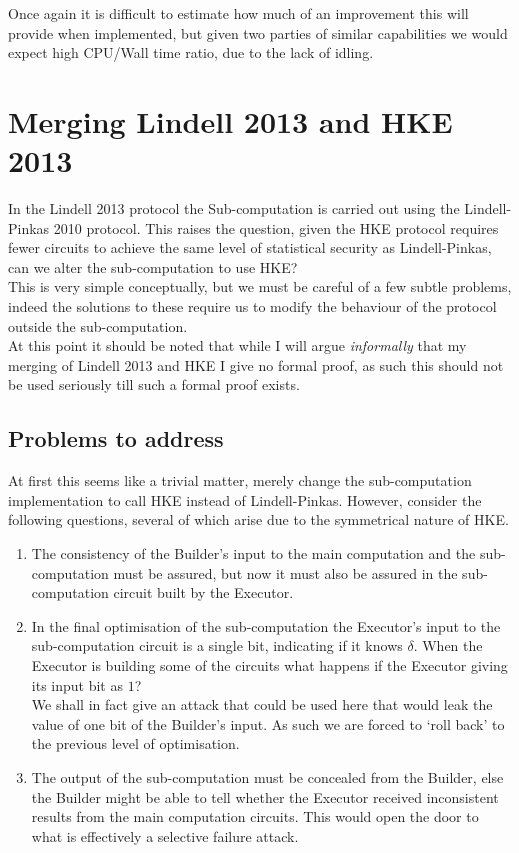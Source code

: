 \documentclass[ %
                    author={Nicholas Tutte},
                supervisor={Prof. Nigel Smart},
                    degree={MEng},
                     title={Secure Two Party Computation},
                  subtitle={A practical comparison of recent protocols},
                      type={Research - GG1K},
                      year={2015} ]{dissertation}
\begin{document}
				Once again it is difficult to estimate how much of an improvement this will provide when implemented, but given two parties of similar capabilities we would expect high CPU/Wall time ratio, due to the lack of idling.


		\section{Merging Lindell 2013 and HKE 2013}
			In the Lindell 2013 protocol the Sub-computation is carried out using the Lindell-Pinkas 2010 protocol. This raises the question, given the HKE protocol requires fewer circuits to achieve the same level of statistical security as Lindell-Pinkas, can we alter the sub-computation to use HKE?\\

			This is very simple conceptually, but we must be careful of a few subtle problems, indeed the solutions to these require us to modify the behaviour of the protocol outside the sub-computation.\\

			At this point it should be noted that while I will argue \emph{informally} that my merging of Lindell 2013 and HKE I give no formal proof, as such this should not be used seriously till such a formal proof exists.

			\subsection{Problems to address}
				At first this seems like a trivial matter, merely change the sub-computation implementation to call HKE instead of Lindell-Pinkas. However, consider the following questions, several of which arise due to the symmetrical nature of HKE.

				\begin{enumerate}
					\item The consistency of the Builder's input to the main computation and the sub-computation must be assured, but now it must also be assured in the sub-computation circuit built by the Executor.

					\item In the final optimisation of the sub-computation the Executor's input to the sub-computation circuit is a single bit, indicating if it knows $\delta$. When the Executor is building some of the circuits what happens if the Executor giving its input bit as $1$?\\

					We shall in fact give an attack that could be used here that would leak the value of one bit of the Builder's input. As such we are forced to `roll back' to the previous level of optimisation.

					\item The output of the sub-computation must be concealed from the Builder, else the Builder might be able to tell whether the Executor received inconsistent results from the main computation circuits. This would open the door to what is effectively a selective failure attack.\\

				\end{enumerate}
\end{document}
